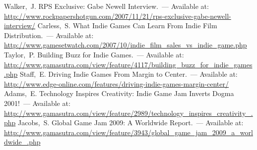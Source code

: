\begin{thebibliography}{10}
     Walker,~J. RPS Exclusive: Gabe Newell Interview.~--- Available at: 
        \url{http://www.rockpapershotgun.com/2007/11/21/rps-exclusive-gabe-newell-interview/}
     Carless,~S. What Indie Games Can Learn From Indie Film Distribution.~--- Available at: 
        \url{http://www.gamesetwatch.com/2007/10/indie_film_sales_vs_indie_game.php}
     Taylor,~P. Building Buzz for Indie Games.~--- Available at: 
        \url{http://www.gamasutra.com/view/feature/4117/building_buzz_for_indie_games.php}
     Staff,~E. Driving Indie Games From Margin to Center.~--- Available at: 
        \url{http://www.edge-online.com/features/driving-indie-games-margin-center/}
     Adams,~E. Technology Inspires Creativity: Indie Game Jam Inverts Dogma 2001!~--- 
        Available at: \url{http://www.gamasutra.com/view/feature/2989/technology_inspires_creativity_.php}
     Jacobs,~S. Global Game Jam 2009: A Worldwide Report.~--- Available at: 
        \url{http://www.gamasutra.com/view/feature/3943/global_game_jam_2009_a_worldwide_.php}
\end{thebibliography}